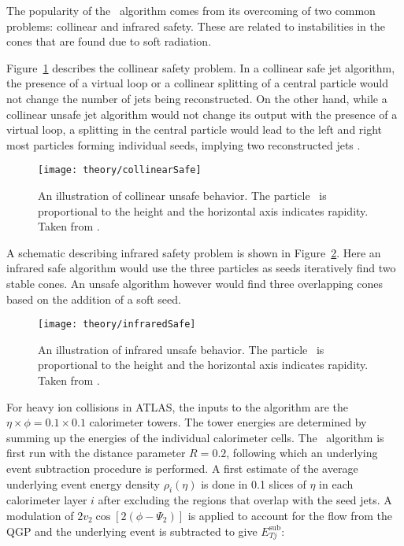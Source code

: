 The popularity of the \antikt\ algorithm comes from its overcoming of two common problems: collinear and infrared safety.
These are related to instabilities in the cones that are found due to soft radiation.


Figure~\ref{fig:collinearSafe} describes the collinear safety problem.
In a collinear safe jet algorithm, the presence of a virtual loop or a collinear splitting of a central particle would not change the number of jets being reconstructed.
On the other hand, while a collinear unsafe jet algorithm would not change its output with the presence of a virtual loop, a splitting in the central particle would lead to the left and right most particles forming individual seeds, implying two reconstructed jets \cite{Salam:2009jx}.

\begin{figure}[htp]
\centering
\texttt{[image: theory/collinearSafe]}
\caption{An illustration of collinear unsafe behavior.
The particle \pt\ is proportional to the height and the horizontal axis indicates rapidity.
Taken from \cite{Salam:2009jx}.
}
\label{fig:collinearSafe}
\end{figure}


A schematic describing infrared safety problem is shown in Figure~\ref{fig:infraredSafe}.
Here an infrared safe algorithm would use the three particles as seeds iteratively find two stable cones.
An unsafe algorithm however would find three overlapping cones based on the addition of a soft seed.

\begin{figure}[htp]
\centering
\texttt{[image: theory/infraredSafe]}
\caption{An illustration of infrared unsafe behavior.
The particle \pt\ is proportional to the height and the horizontal axis indicates rapidity.
Taken from \cite{Salam_2007}.
}
\label{fig:infraredSafe}
\end{figure}


For heavy ion collisions in ATLAS, the inputs to the algorithm are the $\eta \times \phi = 0.1 \times 0.1$ calorimeter towers.
The tower energies are determined by summing up the energies of the individual calorimeter cells.
The \antikt\ algorithm is first run with the distance parameter $R=0.2$, following which an underlying event subtraction procedure is performed.
A first estimate of the average underlying event energy density $\rho_i (\eta)$ is done in 0.1 slices of $\eta$ in each calorimeter layer $i$ after excluding the regions that overlap with the seed jets.
A modulation of $2v_{2} \cos[2(\phi-\Psi_2)] $ is applied to account for the flow from the QGP and the underlying event is subtracted to give $E_{Tj}^{\mathrm{sub}}$:

